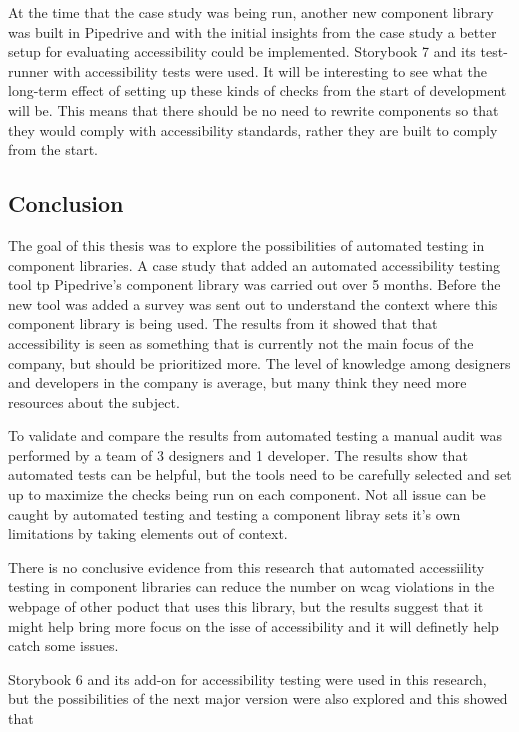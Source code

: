 \documentclass{master_thesis}
\begin{document}
At the time that the case study was being run, another new component library was built in Pipedrive and with the initial insights from the case study a better setup for evaluating accessibility could be implemented. Storybook 7 and its test-runner with accessibility tests were used. It will be interesting to see what the long-term effect of setting up these kinds of checks from the start of development will be. This means that there should be no need to rewrite components so that they would comply with accessibility standards, rather they are built to comply from the start.

\subsection{Conclusion}

The goal of this thesis was to explore the possibilities of automated testing in component libraries. A case study that added an automated accessibility testing tool tp Pipedrive's component library was carried out over 5 months.  Before the new tool was added a survey was sent out to understand the context where this component library is being used. The results from it showed that that accessibility is seen as something that is currently not the main focus of the company, but should be prioritized more. The level of knowledge among designers and developers in the company is average, but many think they need more resources about the subject.

To validate and compare the results from automated testing a manual audit was performed by a team of 3 designers and 1 developer. The results show that automated tests can be helpful, but the tools need to be carefully selected and set up to maximize the checks being run on each component. Not all issue can be caught by automated testing and testing a component libray sets it's own limitations by taking elements out of context.

There is no conclusive evidence from this research that automated accessiility testing in component libraries can reduce the number on \ac{wcag} violations in the webpage of other poduct that uses this library, but the results suggest that it might help bring more focus on the isse of accessibility and it will definetly help catch some issues.

Storybook 6 and its add-on for accessibility testing were used in this research, but the possibilities of the next major version were also explored and this showed that
\end{document}
